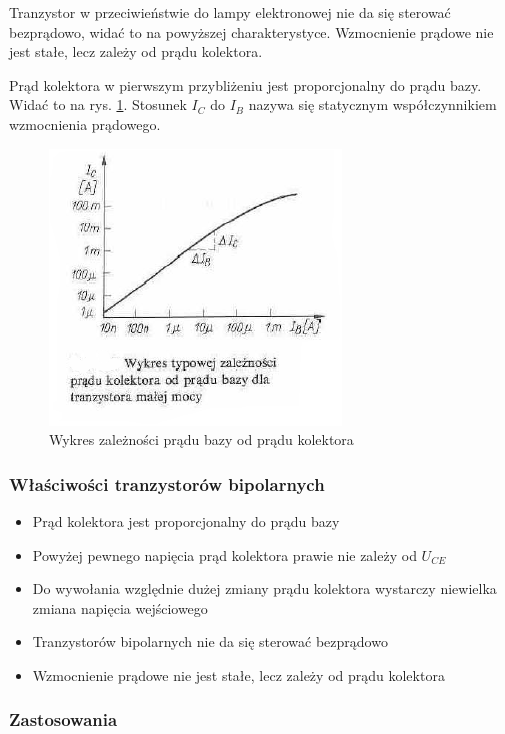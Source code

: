\documentclass[a4paper,twoside]{report}
\begin{document}
Tranzystor w przeciwieństwie do lampy elektronowej nie da się sterować bezprądowo, widać to na powyższej charakterystyce. Wzmocnienie prądowe nie jest stałe, lecz zależy od prądu kolektora.

Prąd kolektora w pierwszym przybliżeniu jest proporcjonalny do prądu bazy. Widać to na rys. \ref{rys:tranBip_Ic(Ib)}. Stosunek $I_C$ do $I_B$ nazywa się statycznym współczynnikiem wzmocnienia prądowego.

\begin{figure}[htbp]
\centering
\includegraphics[scale=0.8]{obrazy/tranzystory/tranbipcha3.png}
\caption{Wykres zależności prądu bazy od prądu kolektora}
\label{rys:tranBip_Ic(Ib)}
\end{figure}

\subsubsection{Właściwości tranzystorów bipolarnych}
\begin{itemize}
\item Prąd kolektora jest proporcjonalny do prądu bazy
\item Powyżej pewnego napięcia prąd kolektora prawie nie zależy od $U_{CE}$
\item Do wywołania względnie dużej zmiany prądu kolektora wystarczy niewielka zmiana napięcia wejściowego
\item Tranzystorów bipolarnych nie da się sterować bezprądowo
\item Wzmocnienie prądowe nie jest stałe, lecz zależy od prądu kolektora
\end{itemize}


\subsubsection{Zastosowania}
\end{document}
